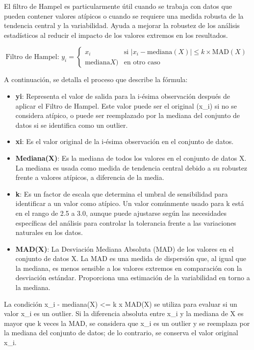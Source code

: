 \documentclass[
  11pt,
  bookmarksnumbered]{article}
\begin{document}
El filtro de Hampel es particularmente útil cuando se trabaja con datos que pueden contener valores atípicos o cuando se requiere una medida robusta de la tendencia central y la variabilidad.
Ayuda a mejorar la robustez de los análisis estadísticos al reducir el impacto de los valores extremos en los resultados.


\begin{equation}\text{Filtro de Hampel: } y_i = \begin{cases} x_i & \text{si } |x_i - \text{mediana}(X)| \leq k \times \text{MAD}(X) \\ \text{mediana} X) & \text{en otro caso} \end{cases}\end{equation}

A continuación, se detalla el proceso que describe la fórmula:

\begin{itemize}
\item
  \textbf{yi}: Representa el valor de salida para la i-ésima observación después de aplicar el Filtro de Hampel.
  Este valor puede ser el original (x\_i) si no se considera atípico, o puede ser reemplazado por la mediana del conjunto de datos si se identifica como un outlier.
\item
  \textbf{xi}: Es el valor original de la i-ésima observación en el conjunto de datos.
\item
  \textbf{Mediana(X)}: Es la mediana de todos los valores en el conjunto de datos X.
  La mediana es usada como medida de tendencia central debido a su robustez frente a valores atípicos, a diferencia de la media.
\item
  \textbf{k}: Es un factor de escala que determina el umbral de sensibilidad para identificar a un valor como atípico.
  Un valor comúnmente usado para k está en el rango de 2.5 a 3.0, aunque puede ajustarse según las necesidades específicas del análisis para controlar la tolerancia frente a las variaciones naturales en los datos.
\item
  \textbf{MAD(X)}: La Desviación Mediana Absoluta (MAD) de los valores en el conjunto de datos X.
  La MAD es una medida de dispersión que, al igual que la mediana, es menos sensible a los valores extremos en comparación con la desviación estándar.
  Proporciona una estimación de la variabilidad en torno a la mediana.
\end{itemize}

La condición \textbar x\_i - mediana(X)\textbar{} \textless= k x MAD(X) se utiliza para evaluar si un valor x\_i es un outlier.
Si la diferencia absoluta entre x\_i y la mediana de X es mayor que k veces la MAD, se considera que x\_i es un outlier y se reemplaza por la mediana del conjunto de datos; de lo contrario, se conserva el valor original x\_i.
\end{document}
